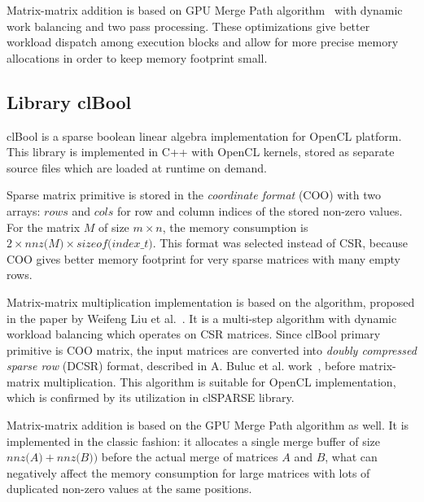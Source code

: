 Matrix-matrix addition is based on GPU Merge Path algorithm~\cite{inproceedings:gpu_merge_path} with dynamic work balancing and two pass processing.
These optimizations give better workload dispatch among execution blocks and allow for more precise memory allocations in order to keep memory footprint small.


\subsection{Library clBool}

clBool is a sparse boolean linear algebra implementation for OpenCL platform.
This library is implemented in C++ with OpenCL kernels, stored as separate source files which are loaded at runtime on demand.

Sparse matrix primitive is stored in the \textit{coordinate format} (COO) with two arrays: $rows$ and $cols$ for row and column indices of the stored non-zero values.
For the matrix $M$ of size $m \times n$, the memory consumption is $2 \times \textit{nnz(M)} \times \textit{sizeof(index\_t)}$.
This format was selected instead of CSR, because COO gives better memory footprint for very sparse matrices with many empty rows.

Matrix-matrix multiplication implementation is based on the algorithm, proposed in the paper by Weifeng Liu et al.~\cite{DBLP:journals/corr/0002V15a:spframework}.
It is a multi-step algorithm with dynamic workload balancing which operates on CSR matrices.
Since clBool primary primitive is COO matrix, the input matrices are converted into \textit{doubly compressed sparse row} (DCSR) format, described in A. Buluc et al. work~\cite{4536313:about:dcsr}, before matrix-matrix multiplication.
This algorithm is suitable for OpenCL implementation, which is confirmed by its utilization in clSPARSE library.

Matrix-matrix addition is based on the GPU Merge Path algorithm as well.
It is implemented in the classic fashion: it allocates a single merge buffer of size $\textit{nnz(A)} + \textit{nnz(B)})$ before the actual merge of matrices $A$ and $B$, what can negatively affect the memory consumption for large matrices with lots of duplicated non-zero values at the same positions.
